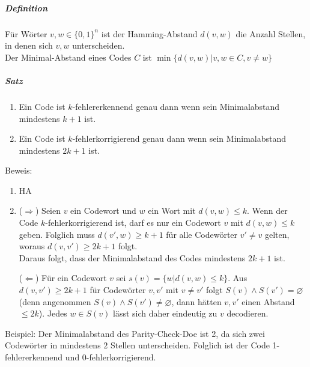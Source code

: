 \documentclass[a4paper]{scrartcl}
\begin{document}
\subparagraph{Definition}
Für Wörter $v,w \in \{ 0,1\}^n$ ist der Hamming-Abstand $d(v,w)$ die Anzahl Stellen, in denen sich $v,w$ unterscheiden.\\
Der Minimal-Abstand eines Codes $C$ ist $\min{\{d(v,w)|v,w\in C, v \neq w \}}$

\subparagraph{Satz}
\begin{enumerate}
\item Ein Code ist $k$-fehlererkennend genau dann wenn sein Minimalabstand mindestens $k+1$ ist.
\item Ein Code ist $k$-fehlerkorrigierend genau dann wenn sein Minimalabstand mindestens $2 k +1$ ist.
\end{enumerate}

Beweis:
\begin{enumerate}
\item HA
\item ($\Rightarrow$) Seien $v$ ein Codewort und $w$ ein Wort mit $d(v,w) \leq k$. Wenn der Code $k$-fehlerkorrigierend ist, darf es nur ein Codewort $v$ mit $d(v,w) \leq k$ geben. Folglich muss $d(v',w) \geq k +1$ für alle Codewörter $v' \neq v$ gelten, woraus $d(v,v') \geq 2k +1$ folgt.\\
Daraus folgt, dass der Minimalabstand des Codes mindestens $2k+1$ ist.

($\Leftarrow$) Für ein Codewort $v$ sei $s(v) = \{ w | d(v,w) \leq k \}$. Aus $d(v,v') \geq 2k +1$ für Codewörter $v,v'$ mit $v \neq v'$ folgt $S(v) \wedge S(v') = \varnothing$ (denn angenommen $S(v) \wedge S(v') \neq \varnothing$, dann hätten $v,v'$ einen Abstand $\leq 2k$). Jedes $w \in S(v)$ lässt sich daher eindeutig zu $v$ decodieren.
\end{enumerate}

Beispiel: Der Minimalabstand des Parity-Check-Doe ist 2, da sich zwei Codewörter in mindestens $2$ Stellen unterscheiden. Folglich ist der Code 1-fehlererkennend und 0-fehlerkorrigierend.
\end{document}
